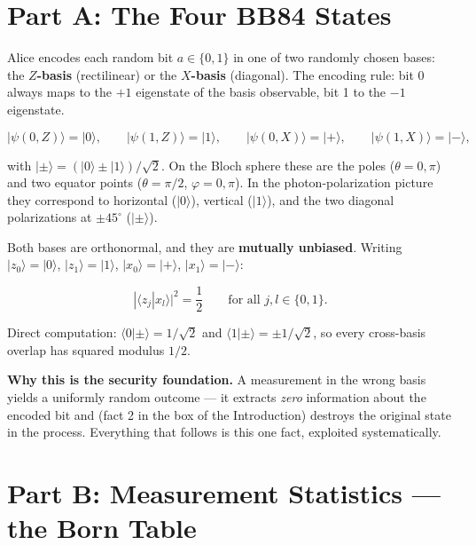 \documentclass[a4paper,11pt]{article}
\providecommand{\ket}[1]{|#1\rangle}
\providecommand{\braket}[2]{\langle#1|#2\rangle}
\begin{document}
\newpage

\section{Part A: The Four BB84 States}

Alice encodes each random bit $a \in \{0,1\}$ in one of two randomly chosen bases:
the \textbf{$Z$-basis} (rectilinear) or the \textbf{$X$-basis} (diagonal). The
encoding rule: bit 0 always maps to the $+1$ eigenstate of the basis observable,
bit 1 to the $-1$ eigenstate.

\begin{equation}
    \ket{\psi(0,Z)} = \ket{0}, \qquad
    \ket{\psi(1,Z)} = \ket{1}, \qquad
    \ket{\psi(0,X)} = \ket{+}, \qquad
    \ket{\psi(1,X)} = \ket{-},
    \label{eq:encoding}
\end{equation}

\noindent with $\ket{\pm} = (\ket{0} \pm \ket{1})/\sqrt{2}$. On the Bloch
sphere these are the poles ($\theta = 0, \pi$) and two equator points
($\theta = \pi/2$, $\varphi = 0, \pi$). In the photon-polarization picture they
correspond to horizontal ($\ket{0}$), vertical ($\ket{1}$), and the two diagonal
polarizations at $\pm 45^\circ$ ($\ket{\pm}$).

Both bases are orthonormal, and they are \textbf{mutually unbiased}. Writing
$\ket{z_0} = \ket{0}$, $\ket{z_1} = \ket{1}$, $\ket{x_0} = \ket{+}$,
$\ket{x_1} = \ket{-}$:

\begin{equation}
    |\braket{z_j}{x_l}|^2 = \frac{1}{2}
    \qquad \text{for all } j, l \in \{0, 1\}.
    \label{eq:mub}
\end{equation}

\noindent Direct computation: $\braket{0}{\pm} = 1/\sqrt{2}$ and
$\braket{1}{\pm} = \pm 1/\sqrt{2}$, so every cross-basis overlap has squared
modulus $1/2$.

\begin{theorybox}
\textbf{Why this is the security foundation.} A measurement in the wrong basis
yields a uniformly random outcome --- it extracts \emph{zero} information about the
encoded bit and (fact 2 in the box of the Introduction) destroys the original state in the process. Everything
that follows is this one fact, exploited systematically.
\end{theorybox}

\section{Part B: Measurement Statistics --- the Born Table}
\end{document}
